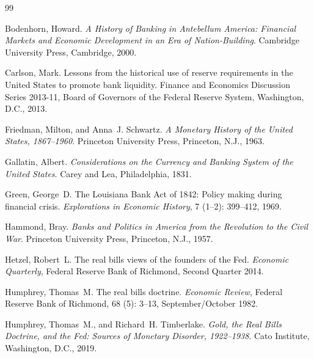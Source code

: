 \documentclass[12pt]{article}
\begin{document}

\begin{thebibliography}{99}

  Bodenhorn, Howard.
  \newblock \emph{A History of Banking in Antebellum America: Financial Markets
    and Economic Development in an Era of Nation-Building}.
  \newblock Cambridge University Press, Cambridge, 2000.

  Carlson, Mark.
  \newblock Lessons from the historical use of reserve requirements in the
    United States to promote bank liquidity.
  \newblock Finance and Economics Discussion Series 2013-11, Board of Governors
    of the Federal Reserve System, Washington, D.C., 2013.

  Friedman, Milton, and Anna~J. Schwartz.
  \newblock \emph{A Monetary History of the United States, 1867--1960}.
  \newblock Princeton University Press, Princeton, N.J., 1963.

  Gallatin, Albert.
  \newblock \emph{Considerations on the Currency and Banking System of the
    United States}.
  \newblock Carey and Lea, Philadelphia, 1831.

  Green, George~D.
  \newblock The Louisiana Bank Act of 1842: Policy making during financial
    crisis.
  \newblock \emph{Explorations in Economic History}, 7 (1--2):
    399--412, 1969.

  Hammond, Bray.
  \newblock \emph{Banks and Politics in America from the Revolution to the Civil
    War}.
  \newblock Princeton University Press, Princeton, N.J., 1957.

  Hetzel, Robert~L.
  \newblock The real bills views of the founders of the Fed.
  \newblock \emph{Economic Quarterly}, Federal Reserve Bank of Richmond,
    Second Quarter 2014.

  Humphrey, Thomas~M.
  \newblock The real bills doctrine.
  \newblock \emph{Economic Review}, Federal Reserve Bank of Richmond,
    68 (5): 3--13, September/October 1982.

  Humphrey, Thomas~M., and Richard~H. Timberlake.
  \newblock \emph{Gold, the Real Bills Doctrine, and the Fed: Sources of
    Monetary Disorder, 1922--1938}.
  \newblock Cato Institute, Washington, D.C., 2019.


\end{thebibliography}
\end{document}
